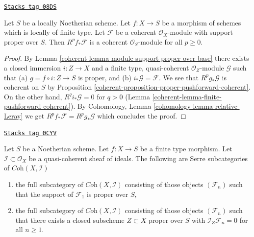 \begin{lemma}
\label{coherent-lemma-support-proper-over-base-pushforward}
\href{https://stacks.math.columbia.edu/tag/08DS}{\texttt{Stacks tag 08DS}}

Let $S$ be a locally Noetherian scheme.
Let $f : X \to S$ be a morphism of schemes which is locally of finite type.
Let $\mathcal{F}$ be a coherent $\mathcal{O}_X$-module
with support proper over $S$. Then $R^pf_*\mathcal{F}$
is a coherent $\mathcal{O}_S$-module for all $p \geq 0$.
\end{lemma}

\begin{proof}

By Lemma \ref{coherent-lemma-module-support-proper-over-base}
there exists a closed immersion $i : Z \to X$ and
a finite type, quasi-coherent $\mathcal{O}_Z$-module
$\mathcal{G}$ such that (a) $g = f \circ i : Z \to S$ is proper, and (b)
$i_*\mathcal{G} = \mathcal{F}$.
We see that $R^pg_*\mathcal{G}$ is coherent on $S$ by
Proposition \ref{coherent-proposition-proper-pushforward-coherent}.
On the other hand, $R^qi_*\mathcal{G} = 0$ for $q > 0$
(Lemma \ref{coherent-lemma-finite-pushforward-coherent}).
By Cohomology, Lemma \ref{cohomology-lemma-relative-Leray}
we get $R^pf_*\mathcal{F} = R^pg_*\mathcal{G}$ which concludes the proof.
\end{proof}

\begin{lemma}
\label{coherent-lemma-systems-with-proper-support}
\href{https://stacks.math.columbia.edu/tag/0CYV}{\texttt{Stacks tag 0CYV}}

Let $S$ be a Noetherian scheme. Let $f : X \to S$ be a finite type morphism.
Let $\mathcal{I} \subset \mathcal{O}_X$ be
a quasi-coherent sheaf of ideals. The following are Serre subcategories
of $\textit{Coh}(X, \mathcal{I})$
\begin{enumerate}
\item the full subcategory of $\textit{Coh}(X, \mathcal{I})$
consisting of those objects $(\mathcal{F}_n)$ such that
the support of $\mathcal{F}_1$ is proper over $S$,
\item the full subcategory of $\textit{Coh}(X, \mathcal{I})$
consisting of those objects $(\mathcal{F}_n)$ such that
there exists a closed subscheme $Z \subset X$ proper over $S$
with $\mathcal{I}_Z \mathcal{F}_n = 0$ for all $n \geq 1$.
\end{enumerate}
\end{lemma}

